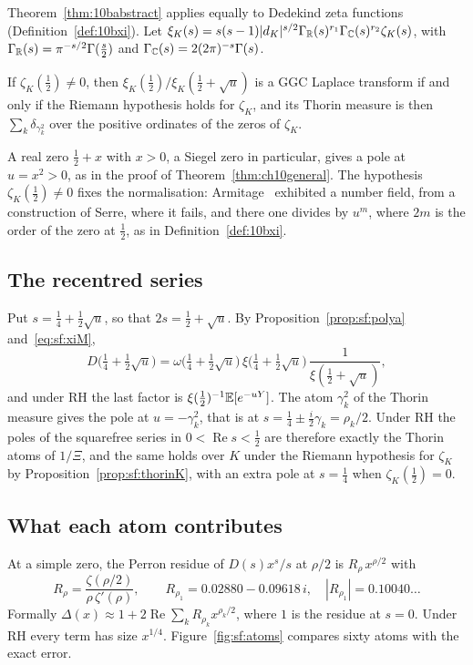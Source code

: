 Theorem~\ref{thm:10babstract} applies equally to Dedekind zeta functions (Definition~\ref{def:10bxi}). Let $\xi_K(s)=s(s-1)|d_K|^{s/2}\Gamma_{\mathbb{R}}(s)^{r_1}\Gamma_{\mathbb{C}}(s)^{r_2}\zeta_K(s)$, with $\Gamma_{\mathbb{R}}(s)=\pi^{-s/2}\Gamma(\frac s2)$ and $\Gamma_{\mathbb{C}}(s)=2(2\pi)^{-s}\Gamma(s)$.

\begin{proposition}\label{prop:sf:thorinK}
If $\zeta_K(\frac12)\ne0$, then $\xi_K(\frac12)/\xi_K(\frac12+\sqrt u)$ is a GGC Laplace transform if and only if the Riemann hypothesis holds for $\zeta_K$, and its Thorin measure is then $\sum_k\delta_{\gamma_k^2}$ over the positive ordinates of the zeros of $\zeta_K$.
\end{proposition}

A real zero $\frac12+x$ with $x>0$, a Siegel zero in particular, gives a pole at $u=x^2>0$, as in the proof of Theorem~\ref{thm:ch10general}. The hypothesis $\zeta_K(\frac12)\ne0$ fixes the normalisation: Armitage~\cite{armitage1972} exhibited a number field, from a construction of Serre, where it fails, and there one divides by $u^m$, where $2m$ is the order of the zero at $\frac12$, as in Definition~\ref{def:10bxi}.

\subsection{The recentred series}
Put $s=\frac14+\frac12\sqrt u$, so that $2s=\frac12+\sqrt u$. By Proposition~\ref{prop:sf:polya} and~\eqref{eq:sf:xiM},
\[
D\bigl(\tfrac14+\tfrac12\sqrt u\bigr)=\omega\bigl(\tfrac14+\tfrac12\sqrt u\bigr)\,\xi\bigl(\tfrac14+\tfrac12\sqrt u\bigr)\,\frac{1}{\xi(\frac12+\sqrt u)},
\]
and under RH the last factor is $\xi(\frac12)^{-1}\mathbb{E}[e^{-uY}]$. The atom $\gamma_k^2$ of the Thorin measure gives the pole at $u=-\gamma_k^2$, that is at $s=\frac14\pm\frac i2\gamma_k=\rho_k/2$. Under RH the poles of the squarefree series in $0<\operatorname{Re} s<\frac12$ are therefore exactly the Thorin atoms of $1/\Xi$, and the same holds over $K$ under the Riemann hypothesis for $\zeta_K$ by Proposition~\ref{prop:sf:thorinK}, with an extra pole at $s=\frac14$ when $\zeta_K(\frac12)=0$.

\subsection{What each atom contributes}
At a simple zero, the Perron residue of $D(s)x^s/s$ at $\rho/2$ is $R_\rho\,x^{\rho/2}$ with
\begin{equation}\label{eq:sf:Rrho}
R_\rho=\frac{\zeta(\rho/2)}{\rho\,\zeta'(\rho)},\qquad R_{\rho_1}=0.02880-0.09618\,i,\quad |R_{\rho_1}|=0.10040\ldots
\end{equation}
Formally $\Delta(x)\approx1+2\operatorname{Re}\sum_kR_{\rho_k}x^{\rho_k/2}$, where $1$ is the residue at $s=0$. Under RH every term has size $x^{1/4}$. Figure~\ref{fig:sf:atoms} compares sixty atoms with the exact error.

